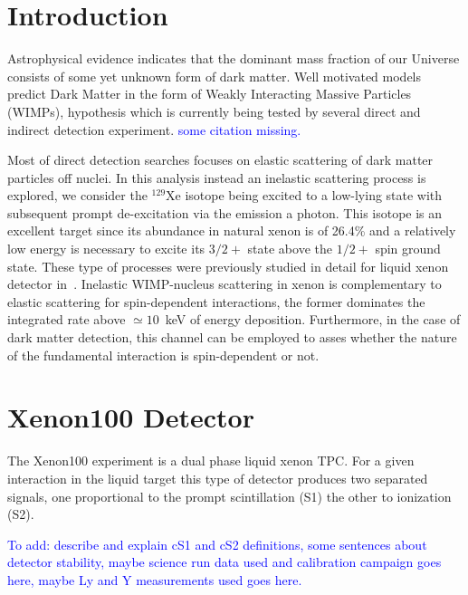 \section{\label{sec:level1} Introduction}
Astrophysical evidence indicates that the dominant mass fraction of our Universe consists of some yet unknown form
of dark matter. Well motivated models predict Dark Matter in the form of Weakly Interacting Massive Particles (WIMPs),
hypothesis which is currently being tested by several direct and indirect detection experiment. 
\textcolor{blue}{some citation missing.}

Most of direct detection searches focuses on  elastic scattering of dark matter particles off nuclei.
In this analysis instead an inelastic scattering process is explored, we consider the $^{129}\text{Xe}$ isotope being excited to a low-lying state
with subsequent prompt de-excitation via the emission a photon. This isotope is an excellent target
since its abundance in natural xenon is of 26.4\% and a relatively low energy is necessary to excite its $3/2+$ state above the $1/2+$
spin ground state. These type of processes were previously studied in detail for liquid xenon detector in~\cite{inelastic_th}.
Inelastic WIMP-nucleus scattering in xenon is complementary to elastic scattering for spin-dependent interactions,
the former dominates the integrated rate above  $\simeq10$~keV of energy deposition.
Furthermore, in the case of dark matter detection, this channel can be employed to asses whether the nature of the fundamental interaction
is spin-dependent or not.


\section{Xenon100 Detector}
The Xenon100 experiment is a  dual phase liquid xenon TPC. For a given interaction in the liquid target this type of detector produces two separated signals,
one proportional to the prompt scintillation (S1) the other to ionization (S2).

\textcolor{blue}{To add: describe and explain cS1 and cS2 definitions, some sentences about detector stability, maybe science run data used and calibration campaign goes here, 
maybe Ly and Y measurements used goes here.} 


